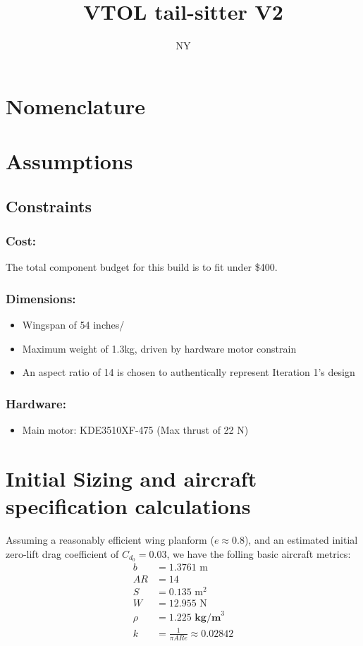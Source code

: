 \documentclass[a4paper,man,natbib]{apa6}
\title{VTOL tail-sitter V2}
\author{NY}
\affiliation{Summer 2026}
\begin{document}
\maketitle

\section{Nomenclature}

\section{Assumptions}
\subsection{Constraints}
\subsubsection{Cost:\\}
The total component budget for this build is to fit under \$400.
\subsubsection{Dimensions:}
\begin{itemize}
    \item Wingspan of 54 inches/
    \item Maximum weight of 1.3kg, driven by hardware motor constrain
\item An aspect ratio of 14 is chosen to authentically represent Iteration 1's design
\end{itemize}
\subsubsection{Hardware:}
\begin{itemize}
    \item Main motor: KDE3510XF-475 (Max thrust of 22 N)
\end{itemize}

\section{Initial Sizing and aircraft specification calculations}

Assuming a reasonably efficient wing planform ($e \approx 0.8$), and an estimated initial zero-lift drag coefficient of $C_{d_0} = 0.03$, we have the folling basic aircraft metrics:
\begin{align*}
    b &= 1.3761 \text{ m}\\
    AR &= 14\\
    S &= 0.135 \text{ m}^2\\
    W &= 12.955 \text{ N}\\
    \rho &= 1.225 \textbf{ kg/m}^3\\
    k &= \frac{1}{\pi ARe} \approx 0.02842\\
\end{align*}
\end{document}
